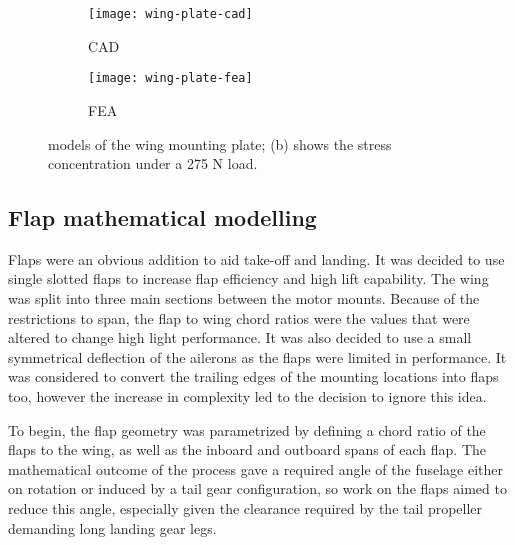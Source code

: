 \documentclass[../../main.tex]{subfiles}
\begin{document}

\begin{figure}[H]

    \centering
    \begin{subfigure}[b]{0.49\columnwidth}
        \centering
        \texttt{[image: wing-plate-cad]}
        \caption{CAD}
        \label{fig:wing-plate:cad}
    \end{subfigure}
    \hfill
    \begin{subfigure}[b]{0.49\columnwidth}
        \centering
        \texttt{[image: wing-plate-fea]}
        \caption{FEA}
        \label{fig:wing-plate:fea}
    \end{subfigure}
    
    \caption{
        models of the wing mounting plate; (b) shows the stress concentration under a 275 N load.
    }
    \label{fig:wing-plate}
\end{figure}

\subsection{Flap mathematical modelling} \label{sec:final-design-proposal:wing:flap-mathematical-modelling}

Flaps were an obvious addition to aid take-off and landing.
It was decided to use single slotted flaps to increase flap efficiency and high lift capability.
The wing was split into three main sections between the motor mounts.
Because of the restrictions to span, the flap to wing chord ratios were the values that were altered to change high light performance.
It was also decided to use a small symmetrical deflection of the ailerons as the flaps were limited in performance.
It was considered to convert the trailing edges of the mounting locations into flaps too, however the increase in complexity led to the decision to ignore this idea. 

To begin, the flap geometry was parametrized by defining a chord ratio of the flaps to the wing, as well as the inboard and outboard spans of each flap.
The mathematical outcome of the process gave a required angle of the fuselage either on rotation or induced by a tail gear configuration, so work on the flaps aimed to reduce this angle, especially given the clearance required by the tail propeller demanding long landing gear legs. 
\end{document}
